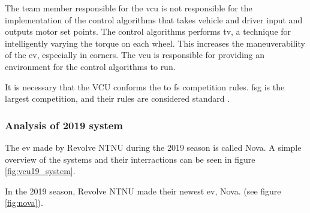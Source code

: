 The team member responsible for the \acrshort{vcu} is not responsible for the implementation of the control algorithms that takes vehicle and driver input and outputs motor set points. The control algorithms performs \acrfull{tv}, a technique for intelligently varying the torque on each wheel. This increases the maneuverability of the \acrshort{ev}, especially in corners. The \acrshort{vcu} is responsible for providing an environment for the control algorithms to run.

It is necessary that the VCU conforms the to \acrshort{fs} competition rules. \acrfull{fsg} is the largest competition, and their rules are considered standard \cite{fsgrules}.



\subsubsection{Analysis of 2019 system}\label{sec:2019sys}

The \acrshort{ev} made by Revolve NTNU during the 2019 season is called Nova. A simple overview of the systems and their interractions can be seen in figure \ref{fig:vcu19_system}.

In the 2019 season, Revolve NTNU made their newest \acrshort{ev}, Nova. (see figure \ref{fig:nova}).


